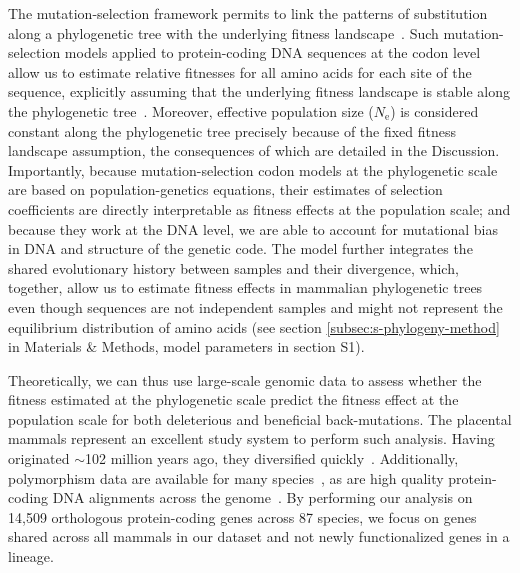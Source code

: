 \documentclass[9pt,twocolumn,twoside,lineno]{pnas-new}
\newcommand{\Ne}{N_{\text{e}}}
\begin{document}
The mutation-selection framework permits to link the patterns of substitution along a phylogenetic tree with the underlying fitness landscape~\cite{halpern_evolutionary_1998, mccandlish_modeling_2014}.
Such mutation-selection models applied to protein-coding DNA sequences at the codon level allow us to estimate relative fitnesses for all amino acids for each site of the sequence, explicitly assuming that the underlying fitness landscape is stable along the phylogenetic tree~\cite{rodrigue_mechanistic_2010, tamuri_estimating_2012, rodrigue_detecting_2017}.
Moreover, effective population size ($\Ne$) is considered constant along the phylogenetic tree precisely because of the fixed fitness landscape assumption, the consequences of which are detailed in the Discussion.
Importantly, because mutation-selection codon models at the phylogenetic scale are based on population-genetics equations, their estimates of selection coefficients are directly interpretable as fitness effects at the population scale; and because they work at the DNA level, we are able to account for mutational bias in DNA and structure of the genetic code.
The model further integrates the shared evolutionary history between samples and their divergence, which, together, allow us to estimate fitness effects in mammalian phylogenetic trees even though sequences are not independent samples and might not represent the equilibrium distribution of amino acids (see section \ref{subsec:s-phylogeny-method} in Materials \& Methods, model parameters in section S1).

Theoretically, we can thus use large-scale genomic data to assess whether the fitness estimated at the phylogenetic scale predict the fitness effect at the population scale for both deleterious and beneficial back-mutations.
The placental mammals represent an excellent study system to perform such analysis.
Having originated $\sim$102 million years ago, they diversified quickly~\cite{foley_genomic_2023}.
Additionally, polymorphism data are available for many species~\cite{howe_ensembl_2021}, as are high quality protein-coding DNA alignments across the genome~\cite{ranwez_orthomam_2007, scornavacca_orthomam_2019}.
By performing our analysis on 14,509 orthologous protein-coding genes across 87 species, we focus on genes shared across all mammals in our dataset and not newly functionalized genes in a lineage.
\end{document}

